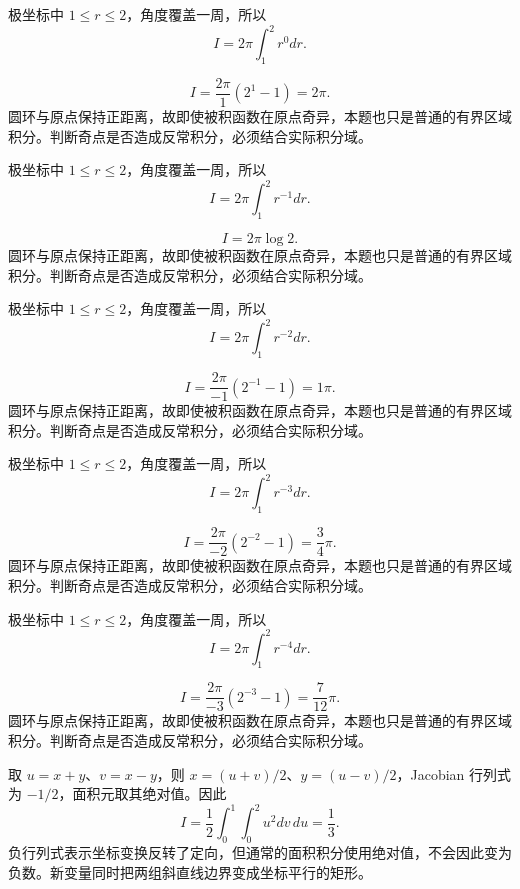 \documentclass[12pt,fontset=fandol]{ctexart}
\begin{document}
\begin{solve}\label{ans:c37q14}
极坐标中 $1\le r\le2$，角度覆盖一周，所以
\[
I=2\pi\int_1^2r^{0}dr.
\]

\[
I=\frac{2\pi}{1}(2^{1}-1)=2\pi.
\]
圆环与原点保持正距离，故即使被积函数在原点奇异，本题也只是普通的有界区域积分。判断奇点是否造成反常积分，必须结合实际积分域。
\end{solve}

\begin{solve}\label{ans:c37q15}
极坐标中 $1\le r\le2$，角度覆盖一周，所以
\[
I=2\pi\int_1^2r^{-1}dr.
\]

\[
I=2\pi\log2.
\]
圆环与原点保持正距离，故即使被积函数在原点奇异，本题也只是普通的有界区域积分。判断奇点是否造成反常积分，必须结合实际积分域。
\end{solve}

\begin{solve}\label{ans:c37q16}
极坐标中 $1\le r\le2$，角度覆盖一周，所以
\[
I=2\pi\int_1^2r^{-2}dr.
\]

\[
I=\frac{2\pi}{-1}(2^{-1}-1)=1\pi.
\]
圆环与原点保持正距离，故即使被积函数在原点奇异，本题也只是普通的有界区域积分。判断奇点是否造成反常积分，必须结合实际积分域。
\end{solve}

\begin{solve}\label{ans:c37q17}
极坐标中 $1\le r\le2$，角度覆盖一周，所以
\[
I=2\pi\int_1^2r^{-3}dr.
\]

\[
I=\frac{2\pi}{-2}(2^{-2}-1)=\frac{3}{4}\pi.
\]
圆环与原点保持正距离，故即使被积函数在原点奇异，本题也只是普通的有界区域积分。判断奇点是否造成反常积分，必须结合实际积分域。
\end{solve}

\begin{solve}\label{ans:c37q18}
极坐标中 $1\le r\le2$，角度覆盖一周，所以
\[
I=2\pi\int_1^2r^{-4}dr.
\]

\[
I=\frac{2\pi}{-3}(2^{-3}-1)=\frac{7}{12}\pi.
\]
圆环与原点保持正距离，故即使被积函数在原点奇异，本题也只是普通的有界区域积分。判断奇点是否造成反常积分，必须结合实际积分域。
\end{solve}

\begin{solve}\label{ans:c37q19}
取 $u=x+y$、$v=x-y$，则 $x=(u+v)/2$、$y=(u-v)/2$，Jacobian 行列式为 $-1/2$，面积元取其绝对值。因此
\[
I=\frac12\int_0^{1}\int_0^{2}u^2dv\,du=\frac{1}{3}.
\]
负行列式表示坐标变换反转了定向，但通常的面积积分使用绝对值，不会因此变为负数。新变量同时把两组斜直线边界变成坐标平行的矩形。
\end{solve}
\end{document}
